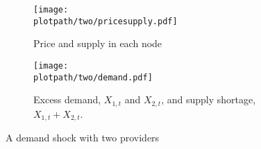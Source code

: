 \begin{figure}[H]
  \begin{subfigure}{0.48\textwidth}
    \centering
    \texttt{[image: \\plotpath/two/pricesupply.pdf]}
    \caption{Price and supply in each node}
  \end{subfigure}
  \hfill
  \begin{subfigure}{0.48\textwidth}
    \centering
    \texttt{[image: \\plotpath/two/demand.pdf]}
    \caption{Excess demand, $X_{1, t}$ and $X_{2, t}$, and supply shortage, $X_{1, t} + X_{2, t}$.}
  \end{subfigure}
  \caption{A demand shock with two providers} \label{fig:two}
\end{figure}

